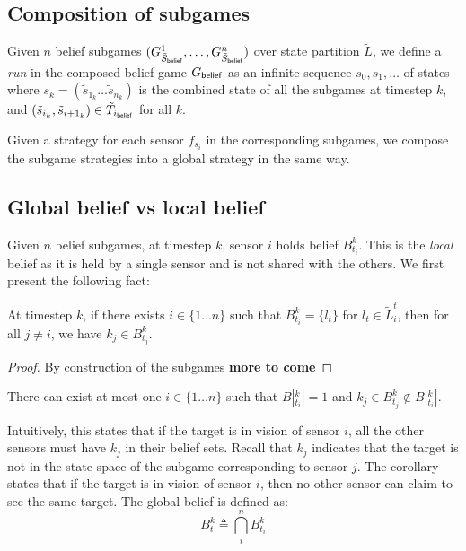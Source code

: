 \subsection{Composition of subgames}
Given $n$ belief subgames $(G^{1}_{\tilde{S}_{\mathsf{belief}}},\ldots,G^{n}_{\tilde{S}_{\mathsf{belief}}})$ over state partition $\widetilde{L}$, we define a \emph{run} in the composed belief game $G_{\mathsf{belief}}$ as an infinite sequence $s_0,s_1,\ldots$ of states where $s_k = (\tilde{s}_{1_k} \ldots \tilde{s}_{n_k})$ is the combined state of all the subgames at timestep $k$, and  $(\tilde{s}_{i_k},\tilde{s}_{{i+1}_k}) \in \tilde{T}_{i_{\mathsf{belief}}}$ for all $k$. 

Given a strategy for each sensor $f_{s_i}$ in the corresponding subgames, we compose the subgame strategies into a global strategy in the same way. 


\subsection{Global belief vs local belief}

Given $n$ belief subgames, at timestep $k$, sensor $i$ holds belief $B^k_{t_i}$. This is the \emph{local} belief as it is held by a single sensor and is not shared with the others. We first present the following fact: 
\begin{theorem} 
At timestep $k$, if there exists $i\in \{1\dots n\}$ such that $B^k_{t_i} = \{l_t\}$ for $l_t \in \widetilde{L}_i^t$, then for all $j \neq i$, we have $k_j \in B^k_{t_j}$.
\end{theorem}
\begin{proof}
By construction of the subgames \textbf{more to come}
\end{proof}
\begin{corollary}\label{corr:uniqi}
There can exist at most one $i\in \{1\dots n\}$ such that $B|^k_{t_i}| = 1$ and $k_j \in B^k_{t_j} \notin B|^k_{t_i}|$.
\end{corollary}
Intuitively, this states that if the target is in vision of sensor $i$, all the other sensors must have $k_j$ in their belief sets. Recall that $k_j$ indicates that the target is not in the state space of the subgame corresponding to sensor $j$. The corollary states that if the target is in vision of sensor $i$, then no other sensor can claim to see the same target. 
The global belief is defined as:
\[B^k_t \triangleq 
\bigcap_{i}^n B^k_{t_i}
\]

 




